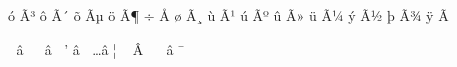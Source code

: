 \mubyte ^^f3 ^^c3^^b3\endmubyte %
\mubyte ^^f4 ^^c3^^b4\endmubyte %
\mubyte ^^f5 ^^c3^^b5\endmubyte %
\mubyte ^^f6 ^^c3^^b6\endmubyte %
\mubyte ^^f7 ^^c5^^93\endmubyte %
\mubyte ^^f8 ^^c3^^b8\endmubyte %
\mubyte ^^f9 ^^c3^^b9\endmubyte %
\mubyte ^^fa ^^c3^^ba\endmubyte %
\mubyte ^^fb ^^c3^^bb\endmubyte %
\mubyte ^^fc ^^c3^^bc\endmubyte %
\mubyte ^^fd ^^c3^^bd\endmubyte %
\mubyte ^^fe ^^c3^^be\endmubyte %
\mubyte ^^ff ^^c3^^9f\endmubyte %

\mubyte ^^15  ^^e2^^80^^93\endmubyte     %
\mubyte ^^16  ^^e2^^80^^94\endmubyte     %
\mubyte '     ^^e2^^80^^99\endmubyte     %
\mubyte \dots ^^e2^^80^^a6\endmubyte     %
\mubyte ~     ^^c2^^a0\endmubyte         %
\mubyte ~     ^^e2^^80^^af\endmubyte     %


\endinput
